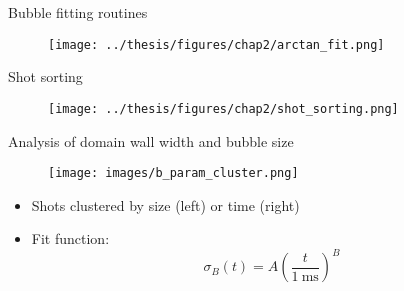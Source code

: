 \documentclass[aspectratio=169]{beamer}
\begin{document}
\begin{frame}{Bubble fitting routines}
  \begin{figure}
      \centering
      \texttt{[image: ../thesis/figures/chap2/arctan\_fit.png]}
  \end{figure}
\end{frame}

\begin{frame}{Shot sorting}
  \begin{figure}
      \centering
      \texttt{[image: ../thesis/figures/chap2/shot\_sorting.png]}
  \end{figure}
\end{frame}

\begin{frame}{Analysis of domain wall width and bubble size}
  \begin{minipage}{0.70\textwidth}
    \begin{figure}
        \centering
        \texttt{[image: images/b\_param\_cluster.png]}
    \end{figure}
  \end{minipage}
  \hspace{0.01\textwidth}
  \begin{minipage}{0.27\textwidth}
    \begin{itemize}
      \item Shots clustered by size (left) or time (right)
      \item Fit function:
      \[
        \sigma_B(t) = A\left(\frac{t}{1\ \unit{\milli\second}}\right)^B
      \] 
    \end{itemize} 
  \end{minipage}
\end{frame}
\end{document}
